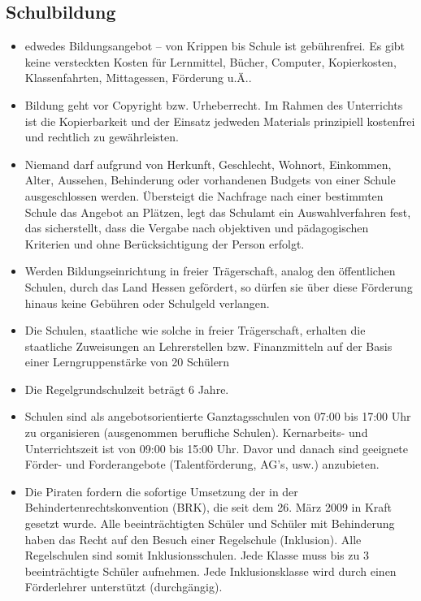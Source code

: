 \documentclass[10pt,a4paper,twocolumn,twoside,titlepage]{article}
\begin{document}
\subsection{Schulbildung}
\begin{itemize}
\item edwedes Bildungsangebot – von Krippen bis Schule ist gebührenfrei. Es gibt keine versteckten Kosten für Lernmittel, Bücher, Computer, Kopierkosten, Klassenfahrten, Mittagessen, Förderung u.Ä..

\item Bildung geht vor Copyright bzw. Urheberrecht. Im Rahmen des Unterrichts ist die Kopierbarkeit und der Einsatz jedweden Materials prinzipiell kostenfrei und rechtlich zu gewährleisten.

\item Niemand darf aufgrund von Herkunft, Geschlecht, Wohnort, Einkommen, Alter, Aussehen, Behinderung oder vorhandenen Budgets von einer Schule ausgeschlossen werden. Übersteigt die Nachfrage nach einer bestimmten Schule das Angebot an Plätzen, legt das Schulamt ein Auswahlverfahren fest, das sicherstellt, dass die Vergabe nach objektiven und pädagogischen Kriterien und ohne Berücksichtigung der Person erfolgt.

\item Werden Bildungseinrichtung in freier Trägerschaft, analog den öffentlichen Schulen, durch das Land Hessen gefördert, so dürfen sie über diese Förderung hinaus keine Gebühren oder Schulgeld verlangen.

\item Die Schulen, staatliche wie solche in freier Trägerschaft, erhalten die staatliche Zuweisungen an Lehrerstellen bzw. Finanzmitteln auf der Basis einer Lerngruppenstärke von 20 Schülern

\item Die Regelgrundschulzeit beträgt 6 Jahre.

\item Schulen sind als angebotsorientierte Ganztagsschulen von 07:00 bis 17:00 Uhr zu organisieren (ausgenommen berufliche Schulen). Kernarbeits- und Unterrichtszeit ist von 09:00 bis 15:00 Uhr. Davor und danach sind geeignete Förder- und Forderangebote (Talentförderung, AG's, usw.) anzubieten.

\item Die Piraten fordern die sofortige Umsetzung der in der Behindertenrechtskonvention (BRK), die seit dem 26. März 2009 in Kraft gesetzt wurde. Alle beeinträchtigten Schüler und Schüler mit Behinderung haben das Recht auf den Besuch einer Regelschule (Inklusion). Alle Regelschulen sind somit Inklusionsschulen. Jede Klasse muss bis zu 3 beeinträchtigte Schüler aufnehmen. Jede Inklusionsklasse wird durch einen Förderlehrer unterstützt (durchgängig).


\end{itemize}
\end{document}

